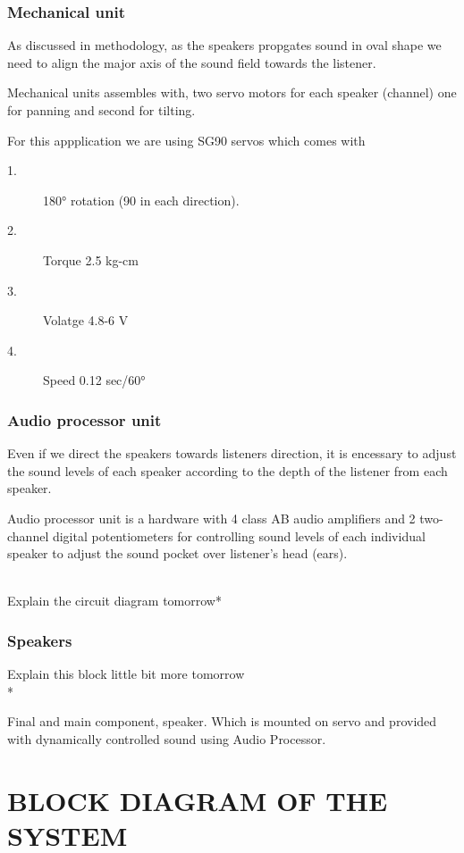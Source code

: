 \documentclass[twocolumn]{report}
\begin{document}
\subsection{Mechanical unit}

As discussed in methodology, as the speakers propgates sound in oval shape we need to align the major 
axis of the sound field towards the listener.

Mechanical units assembles with, two servo motors for each speaker (channel)
one for panning and second for tilting.

For this appplication we are using SG90 servos which comes with

\begin{description}
    \item[1.]180\si{\degree} rotation (90 in each direction).
    \item[2.]Torque 2.5 kg-cm
    \item[3.]Volatge 4.8-6 V  
    \item[4.]Speed 0.12 sec/60\si{\degree}
\end{description}

\subsection{Audio processor unit}

Even if we direct the speakers towards listeners direction, it is encessary to adjust the sound
levels of each speaker according to the depth of the listener from each speaker.

Audio processor unit is a hardware with 4 class AB audio amplifiers and 2 two-channel digital 
potentiometers for controlling sound levels of each individual speaker to adjust the sound 
pocket over listener's head (ears).

\*\\Explain the circuit diagram tomorrow*\

\subsection{Speakers}

\*Explain this block little bit more tomorrow\\*\

Final and main component, speaker. Which is mounted on servo and provided with dynamically controlled 
sound using Audio Processor.

\chapter{BLOCK DIAGRAM OF THE SYSTEM}
\end{document}

